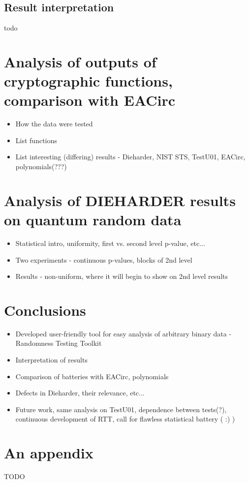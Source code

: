 \documentclass[
  digital,  	%
  color,		%
  oneside,   	%
  12pt,
  nocover,
  notable,
  nolof,
  nolot,
]{fithesis3}
\begin{document}
\section{Result interpretation}
\begin{huge}
todo
\end{huge}


 
\chapter{Analysis of outputs of cryptographic functions, comparison with EACirc}
\begin{itemize}
\item How the data were tested
\item List functions
\item List interesting (differing) results - Dieharder, NIST STS, TestU01, EACirc, polynomials(???)
\end{itemize}

\chapter{Analysis of DIEHARDER results on quantum random data}
\begin{itemize}
\item Statistical intro, uniformity, first vs. second level p-value, etc...
\item Two experiments - continuous p-values, blocks of 2nd level
\item Results - non-uniform, where it will begin to show on 2nd level results
\end{itemize}

\chapter{Conclusions}
\begin{itemize}
\item Developed user-friendly tool for easy analysis of arbitrary binary data - Randomness Testing Toolkit
\item Interpretation of results
\item Comparison of batteries with EACirc, polynomials
\item Defects in Dieharder, their relevance, etc...
\item Future work, same analysis on TestU01, dependence between tests(?), continuous development of RTT, call for flawless statistical battery ( :) )
\end{itemize}

\appendix

\printbibliography

\chapter{An appendix}
\begin{huge}
TODO
\end{huge}
\end{document}
